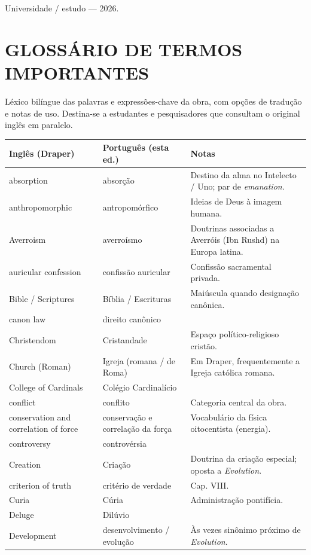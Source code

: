 \documentclass[11pt,a5paper,twoside,openany]{book}
\begin{document}
Universidade / estudo — 2026.

\clearpage
\chapter*{GLOSSÁRIO DE TERMOS IMPORTANTES}
Léxico bilíngue das palavras e expressões-chave da obra, com opções de tradução e notas de uso. Destina-se a estudantes e pesquisadores que consultam o original inglês em paralelo.

\begin{longtable}{p{} | p{} | p{}}
Inglês (Draper) & Português (esta ed.) & Notas \\
\hline
absorption & absorção & Destino da alma no Intelecto / Uno; par de \textit{emanation}. \\
anthropomorphic & antropomórfico & Ideias de Deus à imagem humana. \\
Averroism & averroísmo & Doutrinas associadas a Averróis (Ibn Rushd) na Europa latina. \\
auricular confession & confissão auricular & Confissão sacramental privada. \\
Bible / Scriptures & Bíblia / Escrituras & Maiúscula quando designação canônica. \\
canon law & direito canônico &  \\
Christendom & Cristandade & Espaço político-religioso cristão. \\
Church (Roman) & Igreja (romana / de Roma) & Em Draper, frequentemente a Igreja católica romana. \\
College of Cardinals & Colégio Cardinalício &  \\
conflict & conflito & Categoria central da obra. \\
conservation and correlation of force & conservação e correlação da força & Vocabulário da física oitocentista (energia). \\
controversy & controvérsia &  \\
Creation & Criação & Doutrina da criação especial; oposta a \textit{Evolution}. \\
criterion of truth & critério de verdade & Cap. VIII. \\
Curia & Cúria & Administração pontifícia. \\
Deluge & Dilúvio &  \\
Development & desenvolvimento / evolução & Às vezes sinônimo próximo de \textit{Evolution}. \\

\end{longtable}
\end{document}
